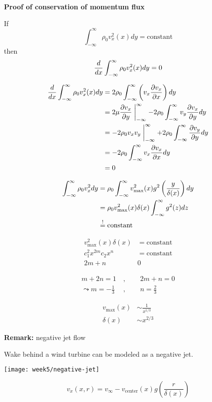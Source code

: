 \noindent\makebox[\linewidth]{\rule{\textwidth}{0.5pt}}
\textbf{Proof of conservation of momentum flux}

If
\begin{equation}
\int_{-\infty}^\infty \rho_0v_x^2(x)dy=\mathrm{constant}
\end{equation}
then
\begin{equation}
\frac{d }{d x}\int_{-\infty}^\infty \rho_0v_x^2(x)dy=0
\end{equation}

\begin{align}
\frac{d }{d x}\int_{-\infty}^\infty \rho_0v_x^2(x)dy &= 2\rho_0\int_
{-\infty}^\infty\left(v_x\frac{\partial v_x}{\partial x}\right)dy \\
&= 2\mu\frac{\partial v_x}{\partial y}\biggm\vert_{-\infty}^\infty-2\rho_0\int_{-\infty}^\infty v_y\frac{\partial v_x}{\partial y}dy \\
&=-2\rho_0v_xv_y\biggm\vert_{-\infty}^\infty + 2\rho_0 \int_{-\infty}^\infty\frac{\partial v_y}{\partial y}dy \\
&= -2\rho_0\int_{-\infty}^\infty v_x\frac{\partial v_x}{\partial x}dy\\
&= 0
\end{align}
\noindent\makebox[\linewidth]{\rule{\textwidth}{0.5pt}}

\begin{align}
\int_{-\infty}^\infty\rho_0v_x^2dy &= \rho_0\int_{-\infty}^\infty v_\mathrm{max}^2(x)g^2\left(\frac{y}{\delta(x)}\right)dy\\
&= \rho_0v_\mathrm{max}^2(x)\delta(x)\int_{-\infty}^\infty g^2(z)dz\\
&\overset{!}{=} \mathrm{constant}
\end{align}

\begin{align}
v_\mathrm{max}^2(x)\delta(x)&=\mathrm{constant}\\
c_1^2x^{2m}c_2x^n &= \mathrm{constant}\\
2m+n&0
\end{align}

\begin{align}
m+2n=1\ &,\qquad 2m+n=0 \\
\leadsto
m=-\frac{1}{3}\ &,\qquad n=\frac{2}{3}
\end{align}

\begin{align}
v_\mathrm{max}(x)&\sim\frac{1}{x^{1/3}}\\
\delta(x)&\sim x^{2/3}
\end{align}

\begin{framed}
\textbf{Remark:} negative jet flow

Wake behind a wind turbine can be modeled as a negative jet.

{\center
\texttt{[image: week5/negative-jet]}\\
}

\begin{equation}
v_x(x,r) = v_\infty-v_\mathrm{center}(x)g\left(\frac{r}{\delta(x)}\right)
\end{equation}
\end{framed}